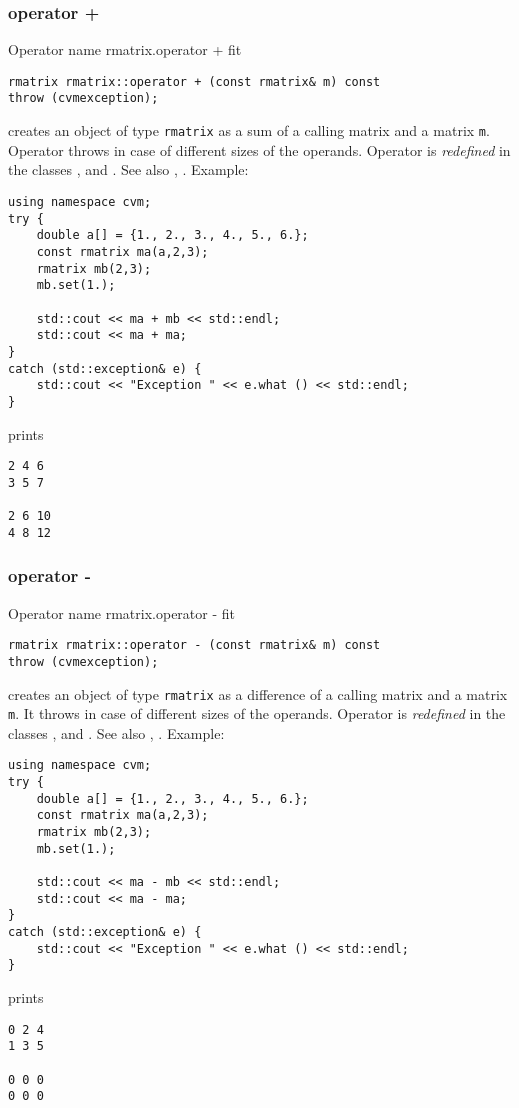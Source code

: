 \subsubsection{operator +}
Operator%
\pdfdest name {rmatrix.operator +} fit
\begin{verbatim}
rmatrix rmatrix::operator + (const rmatrix& m) const
throw (cvmexception);
\end{verbatim}
creates an object of type \verb"rmatrix" as a sum of
a calling matrix and a matrix \verb"m".
Operator throws  
in case of different sizes of the operands.
Operator is \emph{redefined} in the classes
, 
and .
See also , .
Example:
\begin{Verbatim}
using namespace cvm;
try {
    double a[] = {1., 2., 3., 4., 5., 6.};
    const rmatrix ma(a,2,3);
    rmatrix mb(2,3);
    mb.set(1.);

    std::cout << ma + mb << std::endl;
    std::cout << ma + ma;
}
catch (std::exception& e) {
    std::cout << "Exception " << e.what () << std::endl;
}
\end{Verbatim}
prints
\begin{Verbatim}
2 4 6
3 5 7

2 6 10
4 8 12
\end{Verbatim}
\newpage




\subsubsection{operator -}
Operator%
\pdfdest name {rmatrix.operator -} fit
\begin{verbatim}
rmatrix rmatrix::operator - (const rmatrix& m) const
throw (cvmexception);
\end{verbatim}
creates an object of type \verb"rmatrix" as a difference of
a calling matrix and a matrix \verb"m".
It throws  
in case of different sizes of the operands.
Operator is \emph{redefined} in the classes
, 
and .
See also , .
Example:
\begin{Verbatim}
using namespace cvm;
try {
    double a[] = {1., 2., 3., 4., 5., 6.};
    const rmatrix ma(a,2,3);
    rmatrix mb(2,3);
    mb.set(1.);

    std::cout << ma - mb << std::endl;
    std::cout << ma - ma;
}
catch (std::exception& e) {
    std::cout << "Exception " << e.what () << std::endl;
}
\end{Verbatim}
prints
\begin{Verbatim}
0 2 4
1 3 5

0 0 0
0 0 0
\end{Verbatim}
\newpage




